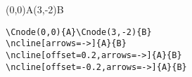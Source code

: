 \documentclass{article}
\begin{document}
\Cnode(0,0){A}\Cnode(3,-2){B}

\vspace{3cm}
\begin{verbatim}
\Cnode(0,0){A}\Cnode(3,-2){B}
\ncline[arrows=->]{A}{B}
\ncline[offset=0.2,arrows=->]{A}{B}
\ncline[offset=-0.2,arrows=->]{A}{B}
\end{verbatim}
\end{document}
